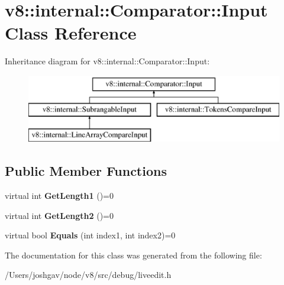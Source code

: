 \hypertarget{classv8_1_1internal_1_1_comparator_1_1_input}{}\section{v8\+:\+:internal\+:\+:Comparator\+:\+:Input Class Reference}
\label{classv8_1_1internal_1_1_comparator_1_1_input}
Inheritance diagram for v8\+:\+:internal\+:\+:Comparator\+:\+:Input\+:\begin{figure}[H]
\begin{center}
\leavevmode
\includegraphics[height=3.000000cm]{classv8_1_1internal_1_1_comparator_1_1_input}
\end{center}
\end{figure}
\subsection*{Public Member Functions}
\begin{DoxyCompactItemize}
\item 
virtual int {\bfseries Get\+Length1} ()=0\hypertarget{classv8_1_1internal_1_1_comparator_1_1_input_aafec821f76bae31fbc0d90787b87ee65}{}\label{classv8_1_1internal_1_1_comparator_1_1_input_aafec821f76bae31fbc0d90787b87ee65}

\item 
virtual int {\bfseries Get\+Length2} ()=0\hypertarget{classv8_1_1internal_1_1_comparator_1_1_input_a05e45844d9326262cb31459978e1198e}{}\label{classv8_1_1internal_1_1_comparator_1_1_input_a05e45844d9326262cb31459978e1198e}

\item 
virtual bool {\bfseries Equals} (int index1, int index2)=0\hypertarget{classv8_1_1internal_1_1_comparator_1_1_input_a4f03cc734488c64a27fe01bd57107cac}{}\label{classv8_1_1internal_1_1_comparator_1_1_input_a4f03cc734488c64a27fe01bd57107cac}

\end{DoxyCompactItemize}


The documentation for this class was generated from the following file\+:\begin{DoxyCompactItemize}
\item 
/\+Users/joshgav/node/v8/src/debug/liveedit.\+h\end{DoxyCompactItemize}
